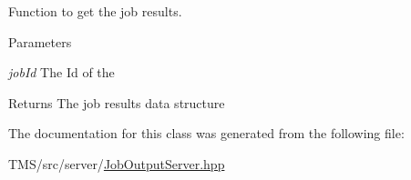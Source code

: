 Function to get the job results. 


\begin{DoxyParams}{Parameters}
\item[{\em jobId}]The Id of the \end{DoxyParams}
\begin{DoxyReturn}{Returns}
The job results data structure 
\end{DoxyReturn}


The documentation for this class was generated from the following file:\begin{DoxyCompactItemize}
\item 
TMS/src/server/\hyperlink{JobOutputServer_8hpp}{JobOutputServer.hpp}\end{DoxyCompactItemize}
